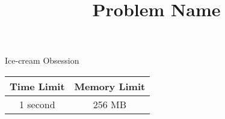 \title{\vspace{-5ex}Problem Name}
\author{\vspace{-5ex}}
\date{\vspace{-5ex}}
\pagestyle{fancy}
\fancyhf{}

\begin{center}
    \huge{Ice-cream Obsession}\small\\
    \vspace{5ex}
    \begin{tabular}{|c|c|} 
        \hline
        Time Limit & Memory Limit \\
        \hline
        1 second & 256 MB \\
        \hline
    \end{tabular}
\end{center}
